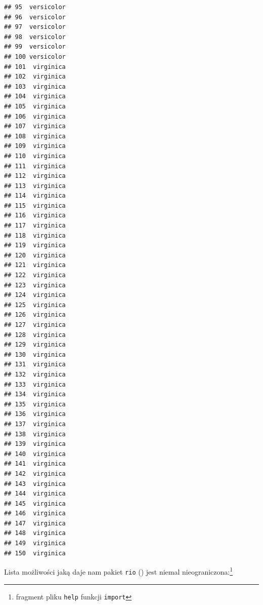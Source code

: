 \documentclass[
]{book}
\theoremstyle{plain}
\theoremstyle{definition}
\theoremstyle{definition}
\theoremstyle{definition}
\theoremstyle{definition}
\theoremstyle{definition}
\theoremstyle{remark}
\begin{document}
\begin{verbatim}
## 95  versicolor
## 96  versicolor
## 97  versicolor
## 98  versicolor
## 99  versicolor
## 100 versicolor
## 101  virginica
## 102  virginica
## 103  virginica
## 104  virginica
## 105  virginica
## 106  virginica
## 107  virginica
## 108  virginica
## 109  virginica
## 110  virginica
## 111  virginica
## 112  virginica
## 113  virginica
## 114  virginica
## 115  virginica
## 116  virginica
## 117  virginica
## 118  virginica
## 119  virginica
## 120  virginica
## 121  virginica
## 122  virginica
## 123  virginica
## 124  virginica
## 125  virginica
## 126  virginica
## 127  virginica
## 128  virginica
## 129  virginica
## 130  virginica
## 131  virginica
## 132  virginica
## 133  virginica
## 134  virginica
## 135  virginica
## 136  virginica
## 137  virginica
## 138  virginica
## 139  virginica
## 140  virginica
## 141  virginica
## 142  virginica
## 143  virginica
## 144  virginica
## 145  virginica
## 146  virginica
## 147  virginica
## 148  virginica
## 149  virginica
## 150  virginica
\end{verbatim}

Lista możliwości jaką daje nam pakiet \texttt{rio} () jest niemal nieograniczona:\footnote{fragment pliku \texttt{help} funkcji \texttt{import}}
\end{document}
